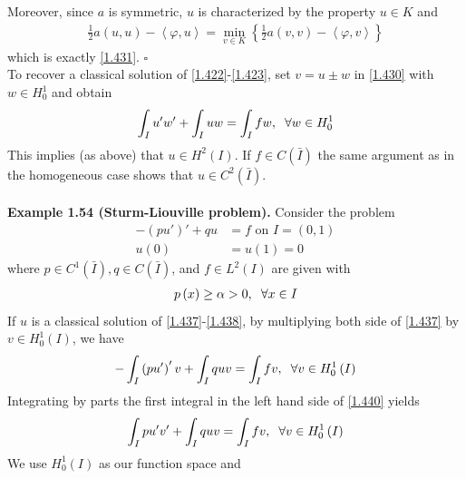 \documentclass[a4paper,oneside]{book}
\numberwithin{equation}{chapter}
\begin{document}
Moreover, since $a$ is symmetric, $u$ is characterized by the property $u\in K$ and
\begin{align}
\frac{1}{2}a\left( {u,u} \right) - \left\langle {\varphi ,u} \right\rangle  = \mathop {\min }\limits_{v \in K} \left\{ {\frac{1}{2}a\left( {v,v} \right) - \left\langle {\varphi ,v} \right\rangle } \right\}
\end{align}
which is exactly \eqref{1.431}. \hfill $\square$\\

To recover a classical solution of \eqref{1.422}-\eqref{1.423}, set $v=u\pm w$ in \eqref{1.430} with $w\in H_0^1$ and obtain 
\begin{align}
\int_I {u'w'}  + \int_I {uw}  = \int_I {fw} ,\hspace{0.2cm}\forall w \in H_0^1
\end{align}
This implies (as above) that $u\in H^2\left(I\right)$. If $f\in C\left(\bar I\right)$ the same argument as in the homogeneous case shows that $u\in C^2\left(\bar I\right)$.\\
\\
\textbf{Example 1.54 (Sturm-Liouville problem).} Consider the problem
\begin{align}
\label{1.437}
 - \left( {pu'} \right)' + qu &= f\mbox{ on } I = \left( {0,1} \right)\\
u\left( 0 \right) &= u\left( 1 \right) = 0 \label{1.438}
\end{align}
where $p\in C^1\left(\bar I\right), q\in C\left(\bar I\right)$, and $f\in L^2\left(I\right)$ are given with
\begin{align}
\label{1.439}
p\left(x\right)\ge \alpha >0, \hspace{0.2cm} \forall x\in I
\end{align}
If $u$ is a classical solution of \eqref{1.437}-\eqref{1.438}, by multiplying both side of \eqref{1.437} by $v\in H_0^1\left(I\right)$, we have
\begin{align}
\label{1.440}
 - \int_I {\left( {pu'} \right)'v}  + \int_I {quv}  = \int_I {fv} , \hspace{0.2cm}\forall v \in H_0^1\left( I \right)
\end{align}
Integrating by parts the first integral in the left hand side of \eqref{1.440} yields
\begin{align}
\int_I {pu'v'}  + \int_I {quv}  = \int_I {fv} ,\hspace{0.2cm}\forall v \in H_0^1\left( I \right)
\end{align}
We use $H_0^1\left(I\right)$ as our function space and 
\end{document}
